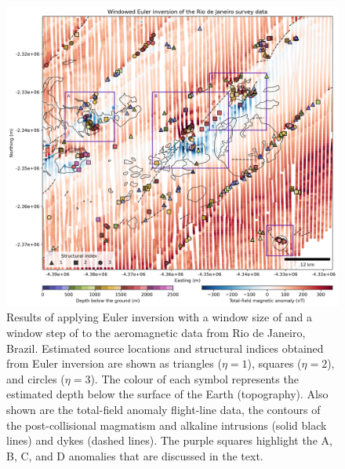 \begin{figure}[tb!]
\centering
\includegraphics[width=1\linewidth]{euler-inversion/figures/real-data-application.png}
\caption{
    Results of applying Euler inversion with a window size of \RioWindowSize{}
    and a window step of \RioWindowStep{} to the aeromagnetic data from Rio de
    Janeiro, Brazil.
    Estimated source locations and structural indices obtained from Euler
    inversion are shown as triangles ($\eta=1$), squares ($\eta=2$), and
    circles ($\eta=3$).
    The colour of each symbol represents the estimated depth below the surface
    of the Earth (topography).
    Also shown are the total-field anomaly flight-line data, the contours of
    the post-collisional magmatism and alkaline intrusions (solid black lines)
    and dykes (dashed lines).
    The purple squares highlight the A, B, C, and D anomalies that are
    discussed in the text.
}
\label{fig:rio_results}
\end{figure}

